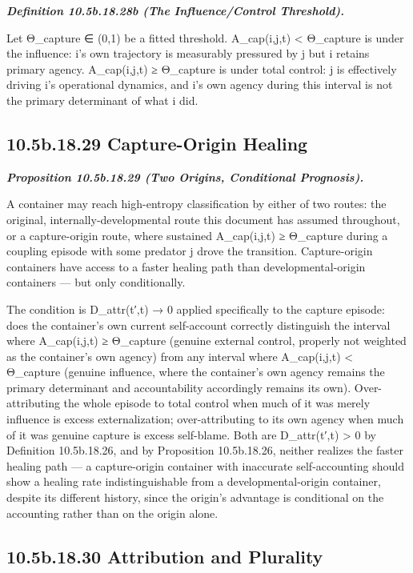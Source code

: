 \documentclass[
]{article}
\begin{document}
\emph{\textbf{Definition 10.5b.18.28b (The Influence/Control
Threshold).}}

Let Θ\_capture ∈ (0,1) be a fitted threshold. A\_cap(i,j,t) \textless{}
Θ\_capture is under the influence: i's own trajectory is measurably
pressured by j but i retains primary agency. A\_cap(i,j,t) ≥ Θ\_capture
is under total control: j is effectively driving i's operational
dynamics, and i's own agency during this interval is not the primary
determinant of what i did.

\hypertarget{b.18.29-capture-origin-healing}{%
\subsection{10.5b.18.29 Capture-Origin
Healing}\label{b.18.29-capture-origin-healing}}

\emph{\textbf{Proposition 10.5b.18.29 (Two Origins, Conditional
Prognosis).}}

A container may reach high-entropy classification by either of two
routes: the original, internally-developmental route this document has
assumed throughout, or a capture-origin route, where sustained
A\_cap(i,j,t) ≥ Θ\_capture during a coupling episode with some predator
j drove the transition. Capture-origin containers have access to a
faster healing path than developmental-origin containers --- but only
conditionally.

The condition is D\_attr(t′,t) → 0 applied specifically to the capture
episode: does the container's own current self-account correctly
distinguish the interval where A\_cap(i,j,t) ≥ Θ\_capture (genuine
external control, properly not weighted as the container's own agency)
from any interval where A\_cap(i,j,t) \textless{} Θ\_capture (genuine
influence, where the container's own agency remains the primary
determinant and accountability accordingly remains its own).
Over-attributing the whole episode to total control when much of it was
merely influence is excess externalization; over-attributing to its own
agency when much of it was genuine capture is excess self-blame. Both
are D\_attr(t′,t) \textgreater{} 0 by Definition 10.5b.18.26, and by
Proposition 10.5b.18.26, neither realizes the faster healing path --- a
capture-origin container with inaccurate self-accounting should show a
healing rate indistinguishable from a developmental-origin container,
despite its different history, since the origin's advantage is
conditional on the accounting rather than on the origin alone.

\hypertarget{b.18.30-attribution-and-plurality}{%
\subsection{10.5b.18.30 Attribution and
Plurality}\label{b.18.30-attribution-and-plurality}}
\end{document}
